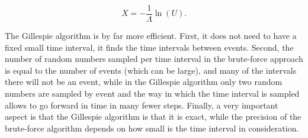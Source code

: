 
\begin{equation}
  X = -\frac{1}{\Lambda}\ln(U).
\end{equation}

The Gillespie algorithm is by far more efficient. First, it does not need to have a fixed small time interval, it finds the time intervals between events. Second, the number of random numbers sampled per time interval in the brute-force approach is equal to the number of events (which can be large), and many of the intervals there will not be an event, while in the Gillespie algorithm only two random numbers are sampled by event and the way in which the time interval is sampled allows to go forward in time in many fewer steps. Finally, a very important aspect is that the Gillespie algorithm is that it is exact, while the precision of the brute-force algorithm depends on how small is the time interval in consideration.
